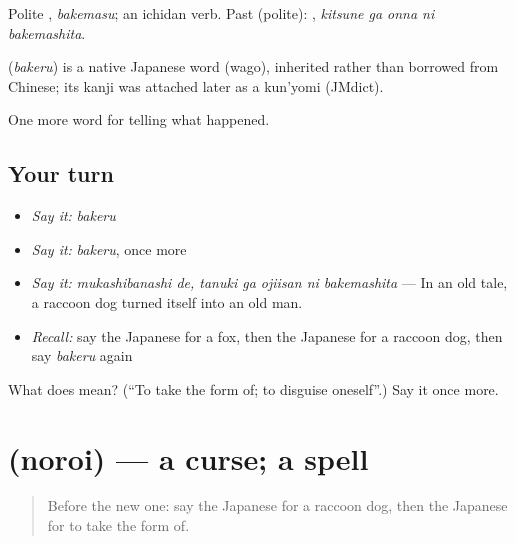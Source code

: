 Polite \textbf{}, \emph{bakemasu}; an ichidan verb. Past (polite): \textbf{  }, \emph{kitsune ga onna ni bakemashita}.

\begin{cousinweb}
\textbf{} (\emph{bakeru}) is a native Japanese word (wago), inherited rather than borrowed from Chinese; its kanji was attached later as a kun'yomi (JMdict).
\end{cousinweb}

\begin{grammarlens}[title={What you've built}]
One more word for telling what happened.
\end{grammarlens}

\subsection*{Your turn}
\begin{itemize}
\raggedright
  \item \emph{Say it:} \emph{bakeru}
  \item \emph{Say it:} \emph{bakeru}, once more
  \item \emph{Say it:} \emph{mukashibanashi de, tanuki ga ojiisan ni bakemashita} — In an old tale, a raccoon dog turned itself into an old man.
  \item \emph{Recall:} say the Japanese for a fox, then the Japanese for a raccoon dog, then say \emph{bakeru} again
\end{itemize}

\begin{tcolorbox}[breakable,colback=teal!4,colframe=teal!35!black,title={Before you move on}]
What does  mean? (\textquotedblleft{}To take the form of; to disguise oneself\textquotedblright{}.) Say it once more.
\end{tcolorbox}
\section[\texorpdfstring{\ja{のろい} (noroi)}{のろい (noroi)}]{ (noroi) — a curse; a spell}

\label{lesson:JA-C300-noroi}



\begin{quote}
Before the new one: say the Japanese for a raccoon dog, then the Japanese for to take the form of.
\end{quote}

